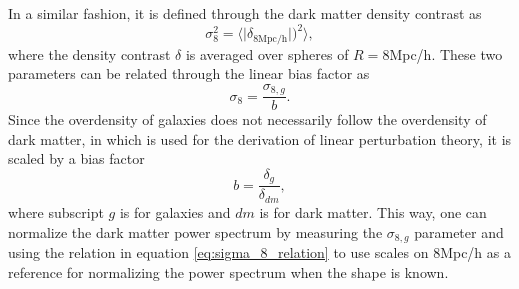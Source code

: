 In a similar fashion, it is defined through the dark matter density contrast as
\begin{equation}
    \sigma_8^2=\Big\langle\vert\delta_{8\mathrm{Mpc/h}}\vert\Big)^2\Big\rangle,
\end{equation}
where the density contrast $\delta$ is averaged over spheres of $R=8$Mpc/h.
These two parameters can be related through the linear bias factor as
\begin{equation}\label{eq:sigma_8_relation}
    \sigma_8=\frac{\sigma_{8,g}}{b}.
\end{equation}
Since the overdensity of galaxies does not
necessarily follow the overdensity of dark matter, in which is used for the derivation of linear perturbation
theory, it is scaled by a bias factor
\begin{equation}\label{eq:bias}
    b=\frac{\delta_g}{\delta_{dm}},
\end{equation}
where subscript $g$ is for galaxies and $dm$ is for dark matter.
This way, one can normalize the dark matter power spectrum by measuring the $\sigma_{8,g}$ parameter and using the relation in equation \ref{eq:sigma_8_relation} to use scales on $8$Mpc/h as a reference for normalizing the power spectrum when the shape is known.
